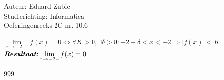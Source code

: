 \documentclass[a4paper]{article}
\begin{document}
  
\noindent \large Auteur: Eduard Zubic \\
\noindent \large Studierichting: Informatica\\
\noindent \large Oefeningenreeks 2C nr. 10.6\\

\medskip

\normalsize

$ \lim\limits_{x\rightarrow -2-}f(x) = 0 \Leftrightarrow  \forall K > 0, \exists\delta > 0 : -2 - \delta < x < -2 \Rightarrow |f(x)| < K  $\\

$ \textbf{\textit{Resultaat:}} \lim\limits_{x\rightarrow -2-}f(x) = 0 $


\begin{thebibliography}{999} 
\end{thebibliography}
\end{document}
